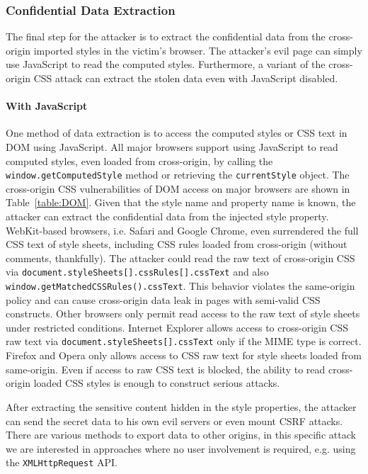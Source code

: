 \documentclass{acm_proc_article-sp}
\begin{document}
\subsubsection{Confidential Data Extraction}
The final step for the attacker is to extract the confidential data from the cross-origin imported styles in the victim's browser. The attacker's evil page can simply use JavaScript to read the computed styles. Furthermore, a variant of the cross-origin CSS attack
can extract the stolen data even with JavaScript disabled.

\paragraph{With JavaScript}
One method of data extraction is to access the computed styles or CSS text in DOM using JavaScript. All major browsers support using JavaScript to read computed styles, even loaded from cross-origin, by calling the \texttt{window.getComputedStyle} method or retrieving the \texttt{currentStyle} object. The cross-origin CSS vulnerabilities of DOM access on major browsers are shown in Table~\ref{table:DOM}. Given that the style name and property name is known, the attacker can extract the confidential data from the injected style property. WebKit-based browsers, i.e. Safari and Google Chrome, even surrendered the full CSS text of style sheets, including CSS rules loaded from cross-origin (without comments, thankfully). The attacker could read the raw text of cross-origin CSS via \texttt{document.styleSheets[].cssRules[].cssText} and also \texttt{window.getMatchedCSSRules().cssText}. This behavior violates the same-origin policy and can cause cross-origin data leak in pages with semi-valid CSS constructs. Other browsers only permit read access to the raw text of style sheets under restricted conditions. Internet Explorer allows access to cross-origin CSS raw text via \texttt{document.styleSheets[].cssText} only if the MIME type is correct. Firefox and Opera only allows access to CSS raw text for style sheets loaded from same-origin. Even if access to raw CSS text is blocked, the ability to read cross-origin loaded CSS styles is enough to construct serious attacks.

After extracting the sensitive content hidden in the style properties, the attacker can send the secret data to his own evil servers or even mount CSRF attacks. There are various methods to export data to other origins, in this specific attack we are interested in approaches where no user involvement is required, e.g. using the \texttt{XMLHttpRequest} API.
\end{document}
